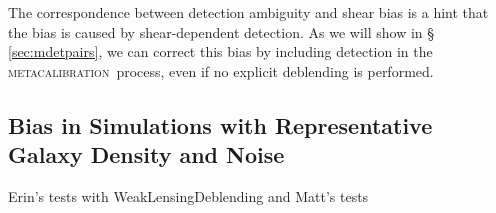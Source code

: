 \documentclass[fleqn,useAMS,usenatbib]{mnras}
\newcommand{\mcal}{\textsc{metacalibration}}
\begin{document}
The correspondence between detection ambiguity and shear bias is a hint that
the bias is caused by shear-dependent detection.  As we will show in \S
\ref{sec:mdetpairs}, we can correct this bias by including detection in the
\mcal\ process, even if no explicit deblending is performed.

\subsection{Bias in Simulations with Representative Galaxy Density and Noise}

Erin's tests with WeakLensingDeblending and Matt's tests





\end{document}
